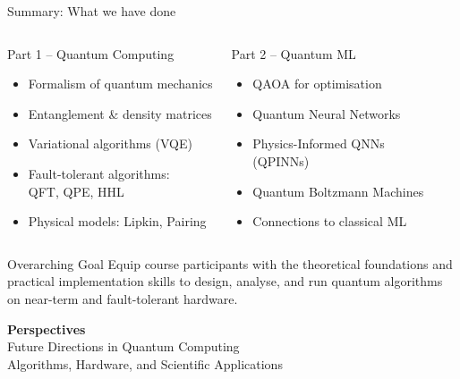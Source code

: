 \documentclass[aspectratio=169,12pt]{beamer}
\begin{document}
\begin{frame}{Summary: What we have done}
  \begin{columns}[T]
      \begin{block}{Part 1 -- Quantum Computing}
        \begin{itemize}
          \item Formalism of quantum mechanics
          \item Entanglement \& density matrices
          \item Variational algorithms (VQE)
          \item Fault-tolerant algorithms:\\
                QFT, QPE, HHL
          \item Physical models: Lipkin, Pairing
        \end{itemize}
      \end{block}
      \begin{block}{Part 2 -- Quantum ML}
        \begin{itemize}
          \item QAOA for optimisation
          \item Quantum Neural Networks
          \item Physics-Informed QNNs\\
                (QPINNs)
          \item Quantum Boltzmann Machines
          \item Connections to classical ML
        \end{itemize}
      \end{block}
  \end{columns}
  \vspace{8pt}
  \begin{alertblock}{Overarching Goal}
    Equip course participants with the theoretical foundations
    and practical implementation skills to design, analyse, and run
    quantum algorithms on near-term and fault-tolerant hardware.
  \end{alertblock}
\end{frame}


\begin{frame}[plain]
  \begin{center}
    \vspace{1.4cm}
    {\Huge\bfseries\color{qblue} Perspectives}\\[0.5em]
    {\Large\color{black} Future Directions in Quantum Computing}\\[0.3em]
    {\normalsize\color{gray} Algorithms, Hardware, and Scientific Applications}
  \end{center}
\end{frame}
\end{document}
